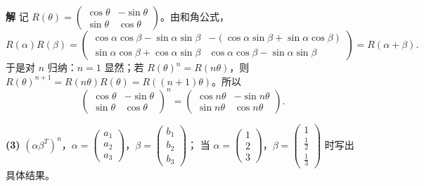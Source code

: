 \documentclass[11pt,a4paper]{ctexart}
\newenvironment{solution}
  {\par\noindent\textbf{解}\quad}
  {\par}
\begin{document}
\begin{solution}
记 $R(\theta)=\begin{pmatrix}\cos\theta&-\sin\theta\\\sin\theta&\cos\theta\end{pmatrix}$。由和角公式，
\[
R(\alpha)R(\beta)
=\begin{pmatrix}
\cos\alpha\cos\beta-\sin\alpha\sin\beta & -(\cos\alpha\sin\beta+\sin\alpha\cos\beta)\\
\sin\alpha\cos\beta+\cos\alpha\sin\beta & \cos\alpha\cos\beta-\sin\alpha\sin\beta
\end{pmatrix}
=R(\alpha+\beta).
\]
于是对 $n$ 归纳：$n=1$ 显然；若 $R(\theta)^n=R(n\theta)$，则 $R(\theta)^{n+1}=R(n\theta)R(\theta)=R((n+1)\theta)$。所以
\[
\begin{pmatrix}\cos\theta&-\sin\theta\\\sin\theta&\cos\theta\end{pmatrix}^n
=\begin{pmatrix}\cos n\theta&-\sin n\theta\\\sin n\theta&\cos n\theta\end{pmatrix}.
\]
\end{solution}

\textbf{(3)} $(\alpha\beta^T)^n$，$\alpha=\begin{pmatrix}a_1\\a_2\\a_3\end{pmatrix}$，$\beta=\begin{pmatrix}b_1\\b_2\\b_3\end{pmatrix}$；
当 $\alpha=\begin{pmatrix}1\\2\\3\end{pmatrix}$，$\beta=\begin{pmatrix}1\\\frac12\\\frac13\end{pmatrix}$ 时写出具体结果。
\end{document}
